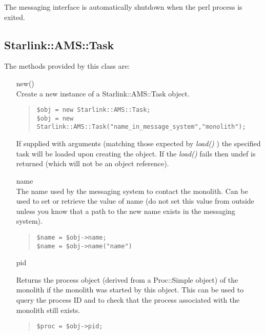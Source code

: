 \documentclass[twoside,11pt]{article}
\newenvironment{myquote}{\begin{quote}\begin{small}}{\end{small}\end{quote}}
\renewcommand{\_}{\texttt{\symbol{95}}}
\begin{document}
The messaging interface is automatically shutdown when the perl process is
exited. 

\subsection{Starlink::AMS::Task}

The methods provided by this class are:

\begin{itemize}

\item[new()]%
%
\hfill\\
Create a new instance of a Starlink::AMS::Task object.
\begin{myquote}
\begin{verbatim}
$obj = new Starlink::AMS::Task;
$obj = new Starlink::AMS::Task("name_in_message_system","monolith");
\end{verbatim}
\end{myquote}

If supplied with arguments (matching those expected by {\em load()\/} ) the
specified task will be loaded upon creating the object. If the {\em load()\/}
fails then undef is returned (which will not be an object reference).

\item[name]%
%
\hfill\\
The name used by the messaging system to contact the monolith.
Can be used to set or retrieve the value of name (do not set
this value from outside unless you know that a path to the 
new name exists in the messaging system).
\begin{myquote}
\begin{verbatim}
$name = $obj->name;
$name = $obj->name("name")
\end{verbatim}
\end{myquote}

\item[pid]%
%

Returns the process object (derived from a Proc::Simple object)
of the monolith if the monolith was started by this object.
This can be used to query the process ID and to check that
the process associated with the monolith still exists.
\begin{myquote}
\begin{verbatim}
$proc = $obj->pid;
\end{verbatim}
\end{myquote}


\end{itemize}
\end{document}
